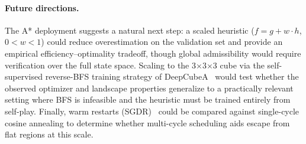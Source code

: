 \documentclass[11pt]{article}
\begin{document}
\paragraph{Future directions.}
The A* deployment suggests a natural next step: a scaled heuristic
($f = g + w \cdot h$, $0 < w < 1$) could reduce overestimation on the
validation set and provide an empirical efficiency--optimality tradeoff, though
global admissibility would require verification over the full state space.
Scaling to the 3$\times$3$\times$3 cube via the self-supervised
reverse-BFS training strategy of DeepCubeA~\cite{agostinelli2019deepcubea}
would test whether the observed optimizer and landscape properties generalize
to a practically relevant setting where BFS is infeasible and the heuristic
must be trained entirely from self-play. Finally, warm restarts
(SGDR)~\cite{loshchilov2017sgdr} could be compared against single-cycle cosine
annealing to determine whether multi-cycle scheduling aids escape from flat
regions at this scale.



\end{document}
